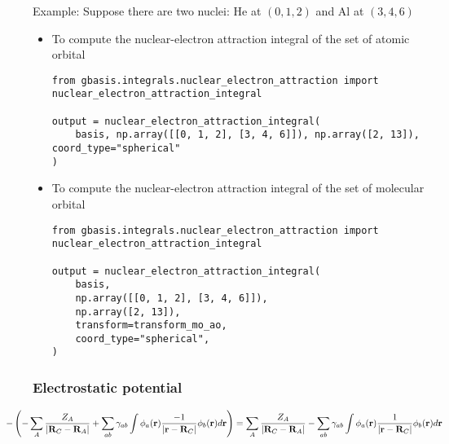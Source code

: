 \documentclass[letterpaper]{article}
\begin{document}
Example:
Suppose there are two nuclei: He at $(0, 1, 2)$ and Al at $(3, 4, 6)$
\begin{itemize}
\item To compute the nuclear-electron attraction integral of the set of atomic
  orbital
  \begin{lstlisting}[xleftmargin=-25pt]
from gbasis.integrals.nuclear_electron_attraction import nuclear_electron_attraction_integral

output = nuclear_electron_attraction_integral(
    basis, np.array([[0, 1, 2], [3, 4, 6]]), np.array([2, 13]), coord_type="spherical"
)
\end{lstlisting}
\item To compute the nuclear-electron attraction integral of the set of molecular
  orbital
  \begin{lstlisting}[xleftmargin=-25pt]
from gbasis.integrals.nuclear_electron_attraction import nuclear_electron_attraction_integral

output = nuclear_electron_attraction_integral(
    basis,
    np.array([[0, 1, 2], [3, 4, 6]]),
    np.array([2, 13]),
    transform=transform_mo_ao,
    coord_type="spherical",
)
\end{lstlisting}
\end{itemize}
\subsubsection{Electrostatic potential}
\begin{equation}
  \label{eq:nuclear_electron_attraction}
  \hspace{-3em}
  - \left(
    - \sum_A \frac{Z_A}{|\mathbf{R}_C - \mathbf{R}_A|}
    + \sum_{ab} \gamma_{ab} \int \phi_a(\mathbf{r}) \frac{-1}{|\mathbf{r} - \mathbf{R}_C|} \phi_b(\mathbf{r}) d\mathbf{r}
  \right)
  =
  \sum_A \frac{Z_A}{|\mathbf{R}_C - \mathbf{R}_A|}
  - \sum_{ab} \gamma_{ab} \int \phi_a(\mathbf{r}) \frac{1}{|\mathbf{r} - \mathbf{R}_C|} \phi_b(\mathbf{r}) d\mathbf{r}
\end{equation}
\end{document}
